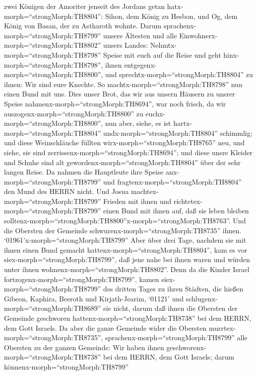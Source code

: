 zwei Königen der Amoriter jenseit des Jordans getan
hatx-morph=``strongMorph:TH8804'': Sihon, dem König zu Hesbon, und Og,
dem König von Basan, der zu Astharoth wohnte.  Darum
sprachenx-morph=``strongMorph:TH8799'' unsere Ältesten und alle
Einwohnerx-morph=``strongMorph:TH8802'' unsers Landes:
Nehmtx-morph=``strongMorph:TH8798'' Speise mit euch auf die Reise und
geht hinx-morph=``strongMorph:TH8798'', ihnen
entgegenx-morph=``strongMorph:TH8800'', und
sprechtx-morph=``strongMorph:TH8804'' zu ihnen: Wir sind eure Knechte.
So machtx-morph=``strongMorph:TH8798'' nun einen Bund mit uns.
 Dies unser Brot, das wir aus unsern Häusern zu unsrer
Speise nahmenx-morph=``strongMorph:TH8694'', war noch frisch, da wir
auszogenx-morph=``strongMorph:TH8800'' zu
euchx-morph=``strongMorph:TH8800'', nun aber, siehe, es ist
hartx-morph=``strongMorph:TH8804'' undx-morph=``strongMorph:TH8804''
schimmlig;  und diese Weinschläuche füllten
wirx-morph=``strongMorph:TH8765'' neu, und siehe, sie sind
zerrissenx-morph=``strongMorph:TH8694''; und diese unsre Kleider und
Schuhe sind alt gewordenx-morph=``strongMorph:TH8804'' über der sehr
langen Reise.  Da nahmen die Hauptleute ihre Speise
anx-morph=``strongMorph:TH8799'' und
fragtenx-morph=``strongMorph:TH8804'' den Mund des HERRN nicht.
 Und Josua machtex-morph=``strongMorph:TH8799'' Frieden mit
ihnen und richtetex-morph=``strongMorph:TH8799'' einen Bund mit ihnen
auf, daß sie leben bleiben
solltenx-morph=``strongMorph:TH8800''x-morph=``strongMorph:TH8763''. Und
die Obersten der Gemeinde schwurenx-morph=``strongMorph:TH8735'' ihnen.
 `01961'\textbar x-morph=``strongMorph:TH8799'' Aber über
drei Tage, nachdem sie mit ihnen einen Bund gemacht
hattenx-morph=``strongMorph:TH8804'', kam es vor
siex-morph=``strongMorph:TH8799'', daß jene nahe bei ihnen waren und
würden unter ihnen wohnenx-morph=``strongMorph:TH8802''. 
Denn da die Kinder Israel fortzogenx-morph=``strongMorph:TH8799'', kamen
siex-morph=``strongMorph:TH8799'' des dritten Tages zu ihren Städten,
die hießen Gibeon, Kaphira, Beeroth und Kirjath-Jearim, 
`01121' und schlugenx-morph=``strongMorph:TH8689'' sie nicht, darum daß
ihnen die Obersten der Gemeinde geschworen
hattenx-morph=``strongMorph:TH8738'' bei dem HERRN, dem Gott Israels. Da
aber die ganze Gemeinde wider die Obersten
murrtex-morph=``strongMorph:TH8735'', 
sprachenx-morph=``strongMorph:TH8799'' alle Obersten zu der ganzen
Gemeinde: Wir haben ihnen geschworenx-morph=``strongMorph:TH8738'' bei
dem HERRN, dem Gott Israels; darum könnenx-morph=``strongMorph:TH8799''

